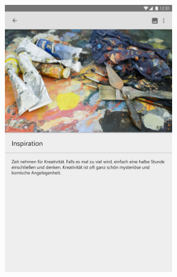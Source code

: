 \begin{figure}[H]
\begin{minipage}[t]{1\textwidth}
\includegraphics[width=7.25cm]{img/NoteActivityImage}\\ %
\end{minipage}
\end{figure}

